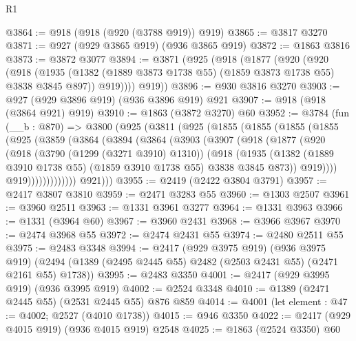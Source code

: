 \begin{lexlean}{R1}
\begin{coremodule}
@3864 := @918 (@918 (@920 (@3788 @919)) @919)
@3865 := @3817 @3270
@3871 := @927 (@929 @3865 @919) (@936 @3865 @919)
@3872 := @1863 @3816
@3873 := @3872 @3077
@3894 := @3871
    (@925
      (@918
        (@1877
          (@920
            (@920
              (@918
                (@1935 (@1382 (@1889 @3873 @1738 @55) (@1859 @3873 @1738 @55) @3838 @3845 @897))
                @919))))
        @919))
@3896 := @930 @3816 @3270
@3903 := @927 (@929 @3896 @919) (@936 @3896 @919) @921
@3907 := @918 (@918 (@3864 @921) @919)
@3910 := @1863 (@3872 @3270) @60
@3952 := @3784
    (fun (__b : @870) =>
    @3800
      (@925
        (@3811
          (@925
            (@1855
              (@1855
                (@1855
                  (@1855
                    (@925
                      (@3859
                        (@3864
                          (@3894
                            (@3864
                              (@3903
                                (@3907
                                  (@918
                                    (@1877
                                      (@920
                                        (@918
                                          (@3790 (@1299 (@3271 @3910) @1310))
                                          (@918
                                            (@1935
                                              (@1382
                                                (@1889 @3910 @1738 @55)
                                                (@1859 @3910 @1738 @55)
                                                @3838
                                                @3845
                                                @873))
                                            @919))))
                                    @919)))))))))))))
          @921)))
@3955 := @2419 (@2422 @3804 @3791)
@3957 := @2417 @3807 @3810
@3959 := @2471 @3283 @55
@3960 := @1303 @2507
@3961 := @3960 @2511
@3963 := @1331 @3961 @3277
@3964 := @1331 @3963
@3966 := @1331 (@3964 @60)
@3967 := @3960 @2431
@3968 := @3966 @3967
@3970 := @2474 @3968 @55
@3972 := @2474 @2431 @55
@3974 := @2480 @2511 @55
@3975 := @2483 @3348
@3994 := @2417
    (@929 @3975 @919)
    (@936 @3975 @919)
    (@2494 (@1389 (@2495 @2445 @55) @2482 (@2503 @2431 @55) (@2471 @2161 @55) @1738))
@3995 := @2483 @3350
@4001 := @2417 (@929 @3995 @919) (@936 @3995 @919)
@4002 := @2524 @3348
@4010 := @1389 (@2471 @2445 @55) (@2531 @2445 @55) @876 @859
@4014 := @4001 (let element : @47 := @4002; @2527 (@4010 @1738))
@4015 := @946 @3350
@4022 := @2417 (@929 @4015 @919) (@936 @4015 @919) @2548
@4025 := @1863 (@2524 @3350) @60

\end{coremodule}
\end{lexlean}
